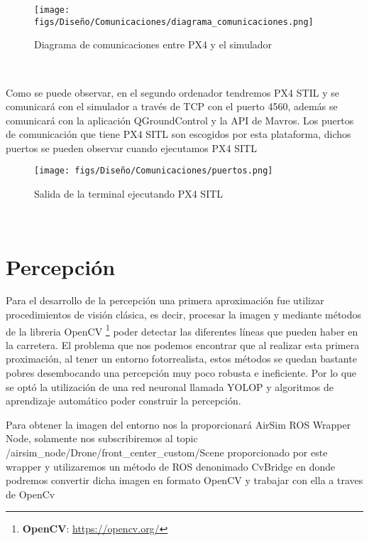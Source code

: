   \begin{figure} [H]
    \begin{center}
      \texttt{[image: figs/Diseño/Comunicaciones/diagrama\_comunicaciones.png]}
    \end{center}
    \caption{Diagrama de comunicaciones entre PX4 y el simulador}
    \label{fig:ROS}
  \end{figure}\

  Como se puede observar, en el segundo ordenador tendremos PX4 STIL y se comunicará con el simulador a través de TCP con el puerto 4560, además se comunicará
  con la aplicación QGroundControl y la API de Mavros. Los puertos de comunicación que tiene PX4 SITL son escogidos por esta plataforma, dichos puertos se pueden observar
  cuando ejecutamos PX4 SITL

  \begin{figure} [H]
    \begin{center}
      \texttt{[image: figs/Diseño/Comunicaciones/puertos.png]}
    \end{center}
    \caption{Salida de la terminal ejecutando PX4 SITL}
    \label{fig:PX4_SITL}
  \end{figure}\

  

  
\newpage
\section{Percepción}
\label{sec:Percepción}
Para el desarrollo de la percepción una primera aproximación fue utilizar
procedimientos de visión clásica, es decir, procesar la imagen y mediante métodos de la libreria OpenCV \footnote{\textbf{OpenCV}: \url{https://opencv.org/}}
poder detectar las diferentes líneas que pueden haber en la carretera. El problema que nos podemos encontrar que al realizar esta primera proximación, al tener un 
entorno fotorrealista, estos métodos se quedan bastante pobres desembocando una percepción muy poco robusta e ineficiente. Por lo que se optó la utilización
de una red neuronal llamada YOLOP y algoritmos de aprendizaje automático poder construir la percepción. \newline

Para obtener la imagen del entorno nos la proporcionará AirSim ROS Wrapper Node, solamente nos subscribiremos al topic /airsim\_node/Drone/front\_center\_custom/Scene proporcionado por este
wrapper y utilizaremos un método de ROS denonimado CvBridge en donde podremos convertir dicha imagen en formato OpenCV y trabajar con ella a traves de OpenCv

